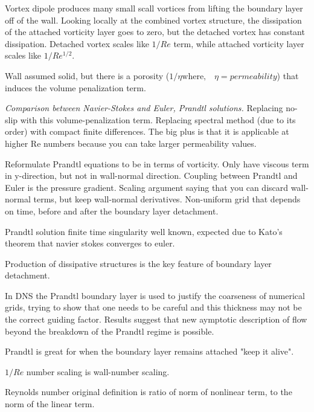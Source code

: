 \begin{description}
{\begin{description}
Vortex dipole produces many small scall vortices from lifting the boundary
layer off of the wall. Looking locally at the combined vortex structure,
the dissipation of the attached vorticity layer goes to zero, but the
detached vortex has constant dissipation. Detached vortex scales like
$1/Re$ term, while attached vorticity layer scales like $1/Re^{1/2}$.

Wall assumed solid, but there is a porosity ($1/\eta \mbox{where,} \quad \eta = permeability$) that induces
the volume penalization term.

\textit{Comparison between Navier-Stokes and Euler, Prandtl solutions.}
Replacing no-slip with this volume-penalization term. Replacing
spectral method (due to its order) with compact finite differences.
The big plus is that it is applicable at higher Re numbers because
you can take larger permeability values.

Reformulate Prandtl equations to be in terms of vorticity. Only have
viscous term in y-direction, but not in wall-normal direction. Coupling
between Prandtl and Euler is the pressure gradient. Scaling argument
saying that you can discard wall-normal terms, but keep wall-normal
derivatives. Non-uniform grid that depends on time, before and
after the boundary layer detachment.

Prandtl solution finite time singularity well known, expected due
to Kato's theorem that navier stokes converges to euler.

Production of dissipative structures is the key feature of boundary layer
detachment.

In DNS the Prandtl boundary layer is used to justify the coarseness
of numerical grids, trying to show that one needs to be careful and this
thickness may not be the correct guiding factor. Results suggest
that new aymptotic description of flow beyond the breakdown of the
Prandtl regime is possible.

Prandtl is great for when the boundary layer remains attached "keep it alive".

$1/Re$ number scaling is wall-number scaling.

Reynolds number original definition is ratio of norm of nonlinear term,
to the norm of the linear term.
\end{description}
}
\end{description}
